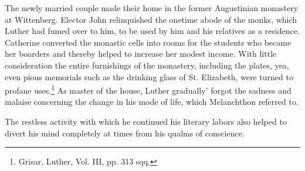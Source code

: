 The newly married couple made their home in the former Augustinian
monastery at Wittenberg. Elector John relinquished the onetime abode of
the monks, which Luther had fumed over to him,
to be used by him and his relatives as a residence. Catherine converted
the monastic cells into rooms for the students who became
her boarders and thereby helped to increase her modest income.
With little consideration the entire furnishings of the monastery,
including the plates, yea, even pious memorials such as the drinking
glass of St. Elizabeth, were turned to profane uses.\footnote
{Grisar, Luther, Vol. III, pp. 313 sqq.}
As master of
the house, Luther gradually’ forgot the sadness and malaise concerning
the change in his mode of life, which Melanchthon referred to.

The restless activity with which he continued his literary labors
also helped to divert his mind completely at times from his qualms
of conscience.
